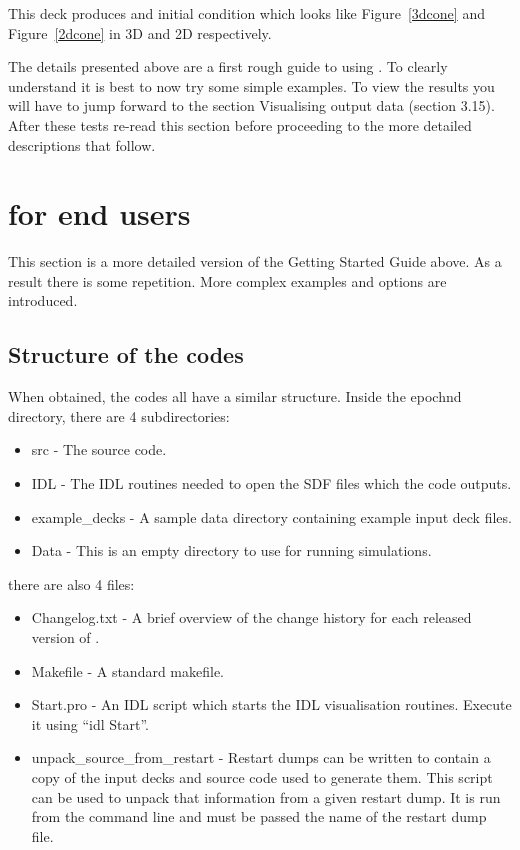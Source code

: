 This deck produces and initial condition which looks like Figure~\ref{3dcone}
and Figure~\ref{2dcone} in 3D and 2D respectively.

The details presented above are a first rough guide to using {\EPOCH}. To
clearly understand {\EPOCH} it is best to now try some simple examples. To
view the results you will have to jump forward to the section
Visualising {\EPOCH} output data (section 3.15). After these tests re-read
this section before proceeding to the more detailed descriptions that follow.


\clearpage

\section{{\EPOCH} for end users}
This section is a more detailed version of the Getting Started Guide above. As
a result there is some repetition. More complex examples and options are
introduced.
\label{sec:endusers}

\subsection{Structure of the {\EPOCH} codes}
When obtained, the {\EPOCH} codes all have a similar structure. Inside the
epoch{n}d directory, there are 4 subdirectories:

\begin{itemize}
\item src - The {\EPOCH} source code.
\item IDL - The IDL routines needed to open the SDF files which the code
  outputs.
\item example\_decks - A sample data directory containing example input deck
  files.
\item Data - This is an empty directory to use for running simulations.
\end{itemize}

there are also 4 files:

\begin{itemize}
\item Changelog.txt - A brief overview of the change history for each
  released version of {\EPOCH}.
\item Makefile - A standard makefile.
\item Start.pro - An IDL script which starts the IDL visualisation
  routines. Execute it using ``idl Start''.
\item unpack\_source\_from\_restart - Restart dumps can be written to contain
  a copy of the input decks and source code used to generate them. This script
  can be used to unpack that information from a given restart dump. It is run
  from the command line and must be passed the name of the restart dump file.
\end{itemize}

